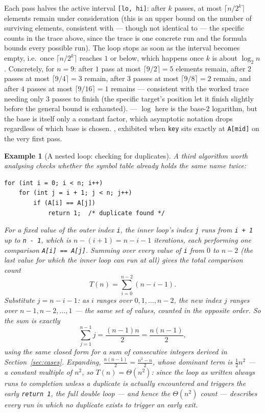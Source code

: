 \documentclass[11pt]{article}
\newtheorem{example}{Example}[section]
\begin{document}
Each pass halves the active interval \texttt{[lo, hi]}: after $k$ passes, at
most $\lceil n / 2^k \rceil$ elements remain under consideration (this is an
upper bound on the number of surviving elements, consistent with --- though
not identical to --- the specific counts in the trace above, since the trace
is one concrete run and the formula bounds every possible run). The loop
stops as soon as the interval becomes empty, i.e.\ once $\lceil n/2^k
\rceil$ reaches $1$ or below, which happens once $k$ is about $\log_2 n$.
Concretely, for $n = 9$: after $1$ pass at most $\lceil 9/2 \rceil = 5$
elements remain, after $2$ passes at most $\lceil 9/4 \rceil = 3$ remain,
after $3$ passes at most $\lceil 9/8 \rceil = 2$ remain, and after $4$
passes at most $\lceil 9/16 \rceil = 1$ remains --- consistent with the
worked trace needing only $3$ passes to finish (the specific target's
position let it finish slightly before the general bound is exhausted).
 --- $\log$ here is the
base-$2$ logarithm, but the base is itself only a constant factor, which
asymptotic notation drops regardless of which base is chosen. , exhibited when \texttt{key} sits
exactly at \texttt{A[mid]} on the very first pass.

\begin{example}[A nested loop: checking for duplicates]
A third algorithm worth analysing checks whether the symbol table already
holds the same name twice:
\begin{verbatim}
for (int i = 0; i < n; i++)
    for (int j = i + 1; j < n; j++)
        if (A[i] == A[j])
            return 1;  /* duplicate found */
\end{verbatim}
For a fixed value of the outer index \texttt{i}, the inner loop's index
\texttt{j} runs from \texttt{i + 1} up to \texttt{n - 1}, which is
$n - (i+1) = n - i - 1$ iterations, each performing one comparison
\texttt{A[i] == A[j]}. Summing over every value of \texttt{i} from $0$ to
$n - 2$ (the last value for which the inner loop can run at all) gives the
total comparison count
\[
  T(n) = \sum_{i=0}^{n-2} (n - i - 1).
\]
Substitute $j = n - i - 1$: as $i$ ranges over $0, 1, \dots, n-2$, the new
index $j$ ranges over $n-1, n-2, \dots, 1$ --- the same set of values,
counted in the opposite order. So the sum is exactly
\[
  \sum_{j=1}^{n-1} j = \frac{(n-1)n}{2} = \frac{n(n-1)}{2},
\]
using the same closed form for a sum of consecutive integers derived in
Section~\ref{sec:cases}. Expanding, $\frac{n(n-1)}{2} = \frac{n^2 - n}{2}$,
whose dominant term is $\frac{1}{2}n^2$ --- a constant multiple of $n^2$, so
$T(n) = \Theta(n^2)$: since the loop as written always runs to completion
unless a duplicate is actually encountered and triggers the early
\texttt{return 1}, the full double loop --- and hence the $\Theta(n^2)$ count
--- describes every run in which no duplicate exists to trigger an early
exit.
\end{example}
\end{document}

